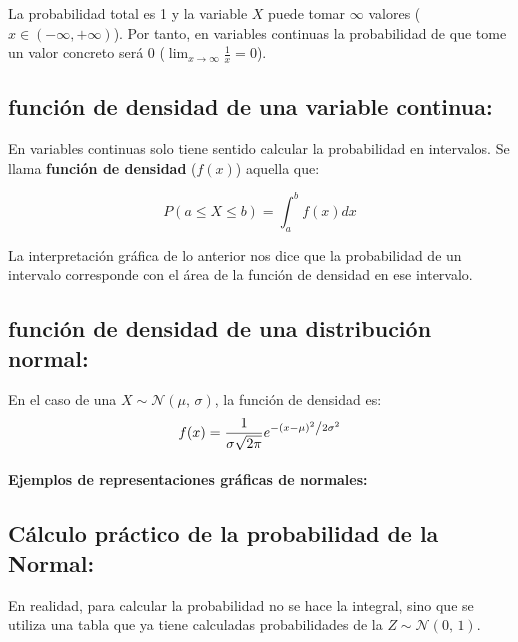 La probabilidad total es 1 y la variable $X$ puede tomar $\infty$ valores ($x \in \left(-\infty, +\infty\right)$). Por tanto, en variables continuas la probabilidad de que tome un valor concreto será 0 ($\lim_{x \to \infty}\frac{1}{x}=0$).    

\subsection{función de densidad de una variable continua:}  En variables continuas solo tiene sentido calcular la probabilidad en intervalos.
Se llama \textbf{función de densidad} ($f(x)$) aquella que: 

$$P\left(a\leq X \leq b \right) = \int_{a}^{b} f(x) dx$$

La interpretación gráfica de lo anterior nos dice que la probabilidad de un intervalo corresponde con el área de la función de densidad en ese intervalo.



\subsection{función de densidad de una distribución normal:}  En el caso de una $
X \sim \mathcal{N}(\mu,\,\sigma)
    $, la función de densidad es:
    $$f(x)=\frac{1}{{\sigma \sqrt {2\pi } }}e^{{{ - \left( {x - \mu } \right)^2 } \mathord{\left/ {\vphantom {{ - \left( {x - \mu } \right)^2 } {2\sigma ^2 }}} \right. \kern-\nulldelimiterspace} {2\sigma ^2 }}}$$
\paragraph{Ejemplos de representaciones gráficas de normales:} 


\subsection{Cálculo práctico de la probabilidad de la Normal:} En realidad, para calcular la probabilidad no se hace la integral, sino que se utiliza una tabla que ya tiene calculadas probabilidades de la  $Z \sim \mathcal{N}(0,\,1)
    $.
    
%












